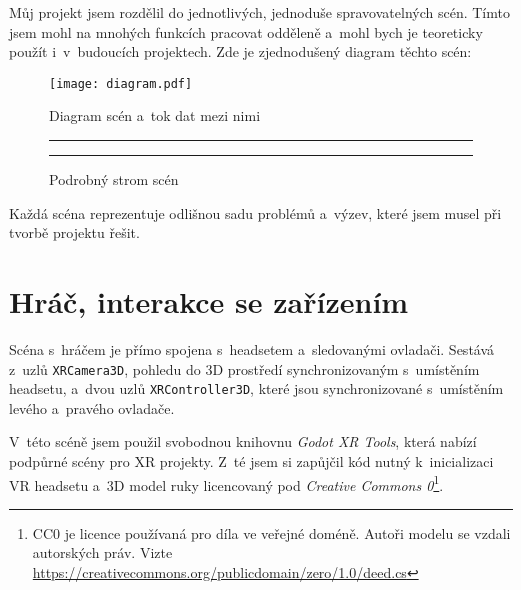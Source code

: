 \begin{samepage}
  Můj projekt jsem rozdělil do jednotlivých, jednoduše spravovatelných scén. Tímto jsem mohl na mnohých funkcích pracovat odděleně a~mohl bych je teoreticky použít i~v~budoucích projektech. Zde je zjednodušený diagram těchto scén:

  \begin{figure}[H]
    \centering
    \texttt{[image: diagram.pdf]}
    \caption{Diagram scén a~tok dat mezi nimi}
  \end{figure}
\end{samepage}


\begin{figure}[H]
  \vspace{1em}
  \hrule
  \vspace{1em}

  \renewcommand\DTstyle{\sffamily}
  \vspace{1em}
  \hrule
  \vspace{1em}
  \caption{Podrobný strom scén}
\end{figure}

Každá scéna reprezentuje odlišnou sadu problémů a~výzev, které jsem musel při tvorbě projektu řešit.

\section{Hráč, interakce se zařízením}

Scéna s~hráčem je přímo spojena s~headsetem a~sledovanými ovladači. Sestává z~uzlů \texttt{XRCamera3D}, pohledu do 3D prostředí synchronizovaným s~umístěním headsetu, a~dvou uzlů \texttt{XRController3D}, které jsou synchronizované s~umístěním levého a~pravého ovladače.

V~této scéně jsem použil svobodnou knihovnu \textit{Godot XR Tools}, která nabízí podpůrné scény pro XR projekty. Z~té jsem si zapůjčil kód nutný k~inicializaci VR headsetu a~3D model ruky licencovaný pod \textit{Creative Commons 0}\footnote{CC0 je licence používaná pro díla ve veřejné doméně. Autoři modelu se vzdali autorských práv. Vizte \url{https://creativecommons.org/publicdomain/zero/1.0/deed.cs}}.

